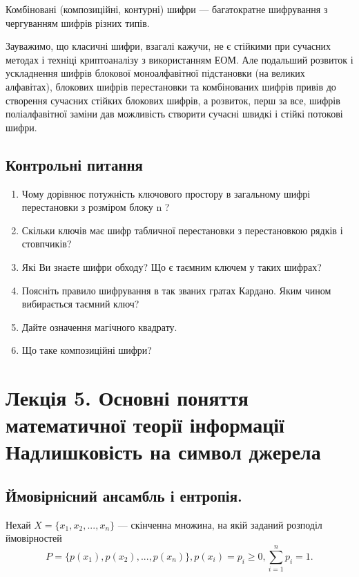 Комбіновані (композиційні, контурні) шифри --- багатократне
шифрування з чергуванням шифрів різних типів.

Зауважимо, що класичні шифри, взагалі кажучи, не є стійкими при
сучасних методах і техніці криптоаналізу з використанням ЕОМ. Але
подальший розвиток і ускладнення шифрів блокової моноалфавітної
підстановки (на великих алфавітах), блокових шифрів перестановки та
комбінованих шифрів привів до створення сучасних стійких блокових шифрів,
а розвиток, перш за все, шифрів поліалфавітної заміни дав можливість
створити сучасні швидкі і стійкі потокові шифри.

\subsection{Контрольні питання}
\begin{enumerate}
    \item Чому дорівнює потужність ключового простору в загальному шифрі перестановки з
    розміром блоку n ?
    
    \item Скільки ключів має шифр табличної перестановки з перестановкою рядків і стовпчиків?
    
    \item Які Ви знаєте шифри обходу? Що є таємним ключем у таких шифрах?
    
    \item Поясніть правило шифрування в так званих гратах Кардано. Яким чином вибирається
    таємний ключ?
    
    \item Дайте означення магічного квадрату.
    
    \item Що таке композиційні шифри?
\end{enumerate}

\section[%
    Основні поняття математичної теорії інформації
    Надлишковість на символ джерела
]{%
    Лекція 5. Основні поняття математичної теорії інформації
    Надлишковість на символ джерела
}

\subsection{Ймовірнісний ансамбль і ентропія.}

Нехай $X = \{x_1, x_2, ..., x_n\}$ --- скінченна множина, на якій заданий
розподіл ймовірностей
$$P = \{p(x_1), p(x_2), ..., p(x_n)\},
p(x_i) = p_i \geqslant 0,
\sum\limits_{i=1}^{n} p_i = 1.$$

